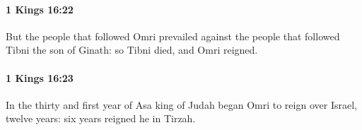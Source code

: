 		\paragraph{1 Kings 16:22} %
			\label{1KINGS-16-22}

			But the people that followed Omri prevailed against the people that followed Tibni the son of Ginath: so Tibni died, and Omri reigned.


		\paragraph{1 Kings 16:23} %
			\label{1KINGS-16-23}

			In the thirty and first year of Asa king of Judah began Omri to reign over Israel, twelve years: six years reigned he in Tirzah.


